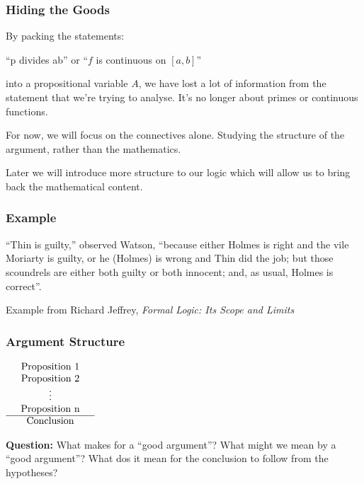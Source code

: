 \documentclass{beamer}
\begin{document}
\begin{frame}
	\frametitle{Hiding the Goods}

	By packing the statements: 
	
	\begin{center}
		``p divides ab'' or ``$f$ is continuous on $[a,b]$''
	\end{center}

	into a propositional variable $A$, we have lost a lot of information from the statement that we're trying to analyse. It's no longer about primes or continuous functions.

	\vspace{0.5cm}

	For now, we will focus on the connectives alone. Studying the structure of the argument, rather than the mathematics.

	\vspace{0.5cm}

	Later we will introduce more structure to our logic which will allow us to bring back the mathematical content. 

\end{frame}
	
\begin{frame}
  \frametitle{Example}
	
	``Thin is guilty,'' observed Watson, ``because either Holmes is right and the vile Moriarty is guilty, or he (Holmes) is wrong and Thin did the job; but those scoundrels are either both guilty or both innocent; and, as usual, Holmes is correct''.
	
	\vspace{5.5cm}


	\footnotesize{Example from Richard Jeffrey, \emph{Formal Logic: Its Scope and Limits}}

\end{frame}


\begin{frame}
	\frametitle{Argument Structure}
	\begin{center}
		$\begin{array}{ l c r }			
			& \textnormal{Proposition 1} & \\
			& \textnormal{Proposition 2} & \\
			& \vdots & \\
			& \textnormal{Proposition n} & \\
			\cline{1 - 3} 
			& \textnormal{Conclusion} & 	
		\end{array}$
	\end{center}

	\vspace{1cm}

{\bf Question:} What makes for a ``good argument''? What might we mean by a ``good argument''? What dos it mean for the conclusion to follow from the hypotheses? 
\end{frame}
\end{document}
